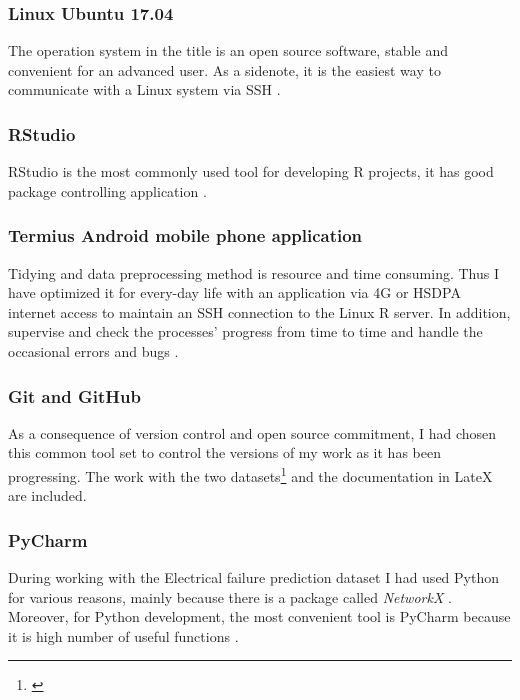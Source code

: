 			\subsubsection{Linux Ubuntu 17.04}
The operation system in the title is an open source software, stable and convenient for an advanced user. As a sidenote, it is the easiest way to communicate with a Linux system \cite{Ubuntu} via SSH \cite{SSH}.
			\subsubsection{RStudio}
RStudio is the most commonly used tool for developing R projects, it has good package controlling application \cite{RStudio}.
			\subsubsection{Termius Android mobile phone application}
Tidying and data preprocessing method is resource and time consuming. Thus I have optimized it for every-day life with an application via 4G or HSDPA internet access to maintain an SSH connection to the Linux R server. In addition, supervise and check the processes' progress from time to time and handle the occasional errors and bugs \cite{Termius}.
			\subsubsection{Git and GitHub}
As a consequence of version control and open source commitment, I had chosen this common tool set \cite{Github} to control the versions of my work as it has been progressing. The work with the two datasets\footnote{\cite{GitHub_CAN_RUL,GitHub_FP_RUL}} and the documentation in LateX \cite{GitHub_Thesis_Text} are included.
			\subsubsection{PyCharm}
During working with the Electrical failure prediction dataset I had used Python for various reasons, mainly because there is a package called \textit{NetworkX} \cite{NetworkX}. Moreover, for Python development, the most convenient tool is PyCharm because it is high number of useful functions \cite{PyCharm}.	
